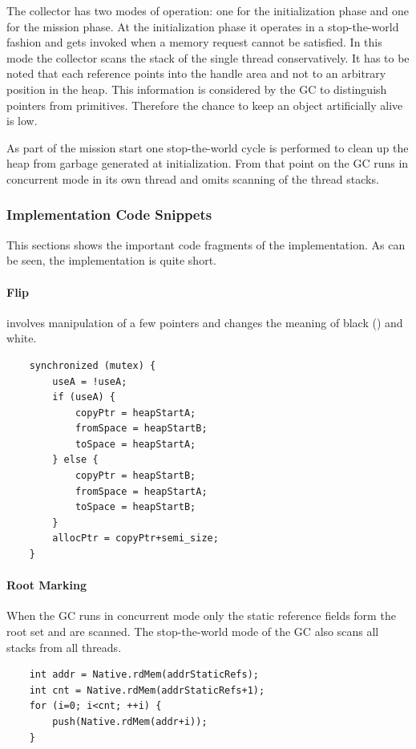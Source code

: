 The collector has two modes of operation: one for the initialization
phase and one for the mission phase. At the initialization phase it
operates in a stop-the-world fashion and gets invoked when a memory
request cannot be satisfied. In this mode the collector scans the
stack of the single thread conservatively. It has to be noted that
each reference points into the handle area and not to an arbitrary
position in the heap. This information is considered by the GC to
distinguish pointers from primitives. Therefore the chance to keep an
object artificially alive is low.

As part of the mission start one stop-the-world cycle is performed to
clean up the heap from garbage generated at initialization. From that
point on the GC runs in concurrent mode in its own thread and omits
scanning of the thread stacks.

\subsubsection{Implementation Code Snippets}

This sections shows the important code fragments of the
implementation. As can be seen, the implementation is quite short.

\paragraph{Flip} involves manipulation of a few pointers and changes
the meaning of black () and white.
%
\begin{lstlisting}
    synchronized (mutex) {
        useA = !useA;
        if (useA) {
            copyPtr = heapStartA;
            fromSpace = heapStartB;
            toSpace = heapStartA;
        } else {
            copyPtr = heapStartB;
            fromSpace = heapStartA;
            toSpace = heapStartB;
        }
        allocPtr = copyPtr+semi_size;
    }
\end{lstlisting}


\paragraph{Root Marking} When the GC runs in concurrent mode only
the static reference fields form the root set and are scanned. The
stop-the-world mode of the GC also scans all stacks from all
threads.
%
\begin{lstlisting}
    int addr = Native.rdMem(addrStaticRefs);
    int cnt = Native.rdMem(addrStaticRefs+1);
    for (i=0; i<cnt; ++i) {
        push(Native.rdMem(addr+i));
    }
\end{lstlisting}

